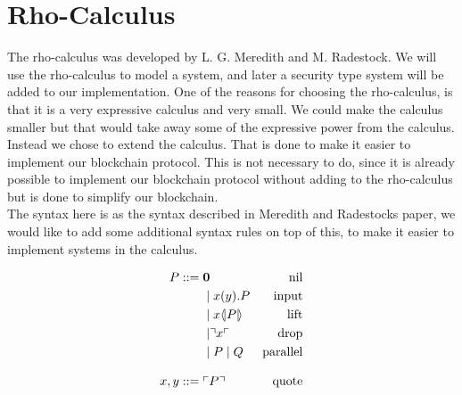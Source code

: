 \section{Rho-Calculus}\label{ch:rho-calculus}



The rho-calculus was developed by L. G. Meredith and M. Radestock\citep{Meredith2005}. We will use the rho-calculus to model a system, and later a security type system will be added to our implementation. One of the reasons for choosing the rho-calculus, is that it is a very expressive calculus and very small. We could make the calculus smaller but that would take away some of the expressive power from the calculus. Instead we chose to extend the calculus. That is done to make it easier to implement our blockchain protocol. This is not necessary to do, since it is already possible to implement our blockchain protocol without adding to the rho-calculus but is done to simplify our blockchain.\\
The syntax here is as the syntax described in Meredith and Radestocks paper\citep{Meredith2005}, we would like to add some additional syntax rules on top of this, to make it easier to implement systems in the calculus.

\begin{align*}
    P  ::= \; &  \mathbf{0} & \text{nil} \\
      & \mid x(y).P & \text{input} \\
      & \mid x \langle \! | P | \! \rangle & \text{lift} \\
      & \mid \urcorner x \ulcorner & \text{drop} \\
      & \mid P \mid Q & \text{parallel} \\[3mm]
    x,y ::= \; & \ulcorner P \urcorner & \text{quote}\\
\end{align*}

